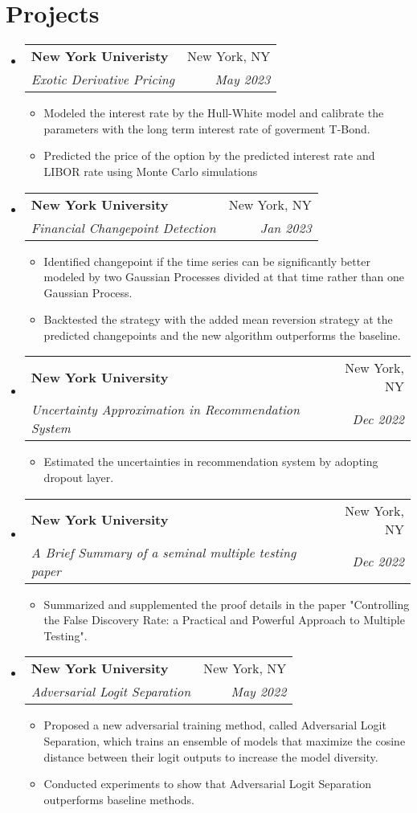 \documentclass[letterpaper,11pt]{article}
\makeatletter
\newcommand{\resumeItem}[1]{
  \item\small{
    {#1 \vspace{-2pt}}
  }
}
\newcommand{\resumeSubheading}[4]{
  \vspace{-2pt}\item
    \begin{tabular*}{0.97\textwidth}[t]{l@{\extracolsep{\fill}}r}
      \textbf{#1} & #2 \\
      \textit{\small#3} & \textit{\small #4} \\
    \end{tabular*}\vspace{-7pt}
}
\newcommand{\resumeSubHeadingListStart}{\begin{itemize}[leftmargin=0.15in, label={}]}
\newcommand{\resumeSubHeadingListEnd}{\end{itemize}}
\newcommand{\resumeItemListStart}{\begin{itemize}}
\newcommand{\resumeItemListEnd}{\end{itemize}\vspace{-5pt}}
\makeatother
\begin{document}
\section{Projects}
  \vspace{3pt}
  \resumeSubHeadingListStart
    \resumeSubheading
        {New York Univeristy}{New York, NY}
        {Exotic Derivative Pricing}{May 2023}
        \resumeItemListStart
            \resumeItem{Modeled the interest rate by the Hull-White model and calibrate the parameters with the long term interest rate of goverment T-Bond.}
            \resumeItem{Predicted the price of the option by the predicted interest rate and LIBOR rate using Monte Carlo simulations}
    \resumeItemListEnd
    \resumeSubheading
      {New York University}{New York, NY}
      {Financial Changepoint Detection}{Jan 2023}
        \resumeItemListStart
            \resumeItem{Identified changepoint if the time series can be significantly better modeled by two Gaussian Processes divided at that time rather than one Gaussian Process.}
            \resumeItem{Backtested the strategy with the added mean reversion strategy at the predicted changepoints and the new algorithm outperforms the baseline.}
    \resumeItemListEnd
    \resumeSubheading
      {New York University}{New York, NY}
      {Uncertainty Approximation in Recommendation System}{Dec 2022}
      \resumeItemListStart
        \resumeItem{Estimated the uncertainties in recommendation system by adopting dropout layer.}
      \resumeItemListEnd
    \resumeSubheading
      {New York University}{New York, NY}
      {A Brief Summary of a seminal multiple testing paper}{Dec 2022}
      \resumeItemListStart
        \resumeItem{Summarized and supplemented the proof details in the paper "Controlling the False Discovery Rate: a Practical and Powerful Approach to Multiple Testing".}
      \resumeItemListEnd
    \resumeSubheading
      {New York University}{New York, NY}
      {Adversarial Logit Separation}{May 2022}
      \resumeItemListStart
        \resumeItem{Proposed a new adversarial training method, called Adversarial Logit Separation, which trains an ensemble of models that maximize the cosine distance between their logit outputs to increase the model diversity.}
        \resumeItem{Conducted experiments to show that Adversarial Logit Separation outperforms baseline methods.}
      \resumeItemListEnd

  \resumeSubHeadingListEnd

\end{document}
